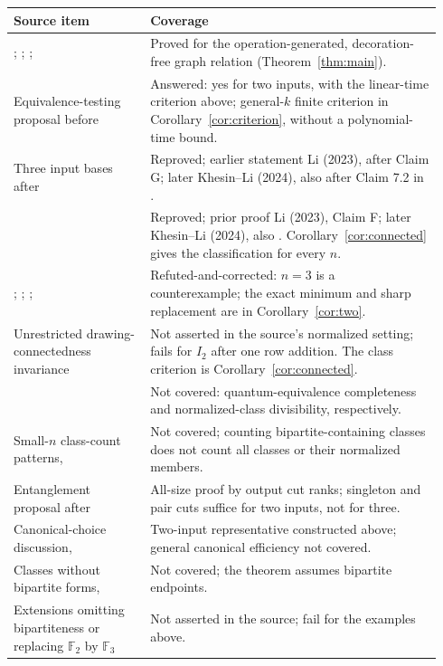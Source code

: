 \documentclass[11pt]{article}
\newcommand{\F}{\mathbb F_2}
\begin{document}
\begin{center}
\small
\begin{tabular}{@{}p{0.30\linewidth}p{0.64\linewidth}@{}}
\toprule
Source item & Coverage\\
\midrule
\cite[Conjecture 8.3]{KL}; \cite[Conjecture 5.8.3]{Khesin};
\cite[Conjecture 7.1]{KL0}; \cite[Conjecture H]{Li}
 & Proved for the operation-generated, decoration-free graph relation
   (Theorem~\ref{thm:main}).\\[3pt]
Equivalence-testing proposal before \cite[Conjecture 8.3, p.~23]{KL}
 & Answered: yes for two inputs, with the linear-time criterion above;
   general-$k$ finite criterion in Corollary~\ref{cor:criterion}, without
   a polynomial-time bound.\\[3pt]
Three input bases after \cite[Proposition 8.2]{KL}
 & Reproved; earlier statement Li (2023), after Claim G; later
   Khesin--Li (2024), also after Claim 7.2 in \cite{KL0}.\\[3pt]
\cite[Proposition 8.1, p.~22]{KL}
 & Reproved; prior proof Li (2023), Claim F; later Khesin--Li (2024), also \cite[Claim 7.1]{KL0}. Corollary~\ref{cor:connected}
   gives the classification for every $n$.\\[3pt]
\cite[Proposition 8.2, p.~23]{KL}; \cite[Proposition 5.8.2]{Khesin};
\cite[Claim 7.2]{KL0}; \cite[Claim G]{Li}
 & Refuted-and-corrected: $n=3$ is a counterexample; the exact minimum
   and sharp replacement are in Corollary~\ref{cor:two}.\\[3pt]
Unrestricted drawing-connectedness invariance
 & Not asserted in the source's normalized setting; fails for $I_2$
   after one row addition. The class criterion is Corollary~\ref{cor:connected}.\\[3pt]
\cite[Conjectures 6.3 and 7.1]{KL}
 & Not covered: quantum-equivalence completeness and normalized-class
   divisibility, respectively.\\[3pt]
Small-$n$ class-count patterns, \cite[Section 7]{KL}
 & Not covered; counting bipartite-containing classes does not count
   all classes or their normalized members.\\[3pt]
Entanglement proposal after \cite[Conjecture 8.3]{KL}
 & All-size proof by output cut ranks; singleton and pair cuts suffice
   for two inputs, not for three.\\[3pt]
Canonical-choice discussion, \cite[Section 8, pp.~21--22]{KL}
 & Two-input representative constructed above; general canonical
   efficiency not covered.\\[3pt]
Classes without bipartite forms, \cite[Section 8, pp.~23--24]{KL}
 & Not covered; the theorem assumes bipartite endpoints.\\[3pt]
Extensions omitting bipartiteness or replacing $\F$ by $\mathbb F_3$
 & Not asserted in the source; fail for the examples above.\\
\bottomrule
\end{tabular}
\end{center}
\end{document}

